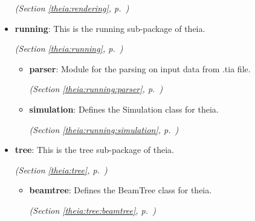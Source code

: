 \begin{itemize}
  \textit{(Section \ref{theia:rendering}, p.~\pageref{theia:rendering})}

\item \textbf{running}: This is the running sub-package of theia.



  \textit{(Section \ref{theia:running}, p.~\pageref{theia:running})}

  \begin{itemize}
\setlength{\parskip}{0ex}
    \item \textbf{parser}: Module for the parsing on input data from .tia file.



  \textit{(Section \ref{theia:running:parser}, p.~\pageref{theia:running:parser})}

    \item \textbf{simulation}: Defines the Simulation class for theia.



  \textit{(Section \ref{theia:running:simulation}, p.~\pageref{theia:running:simulation})}

  \end{itemize}
\item \textbf{tree}: This is the tree sub-package of theia.



  \textit{(Section \ref{theia:tree}, p.~\pageref{theia:tree})}

  \begin{itemize}
\setlength{\parskip}{0ex}
    \item \textbf{beamtree}: Defines the BeamTree class for theia.



  \textit{(Section \ref{theia:tree:beamtree}, p.~\pageref{theia:tree:beamtree})}

  \end{itemize}
\end{itemize}

